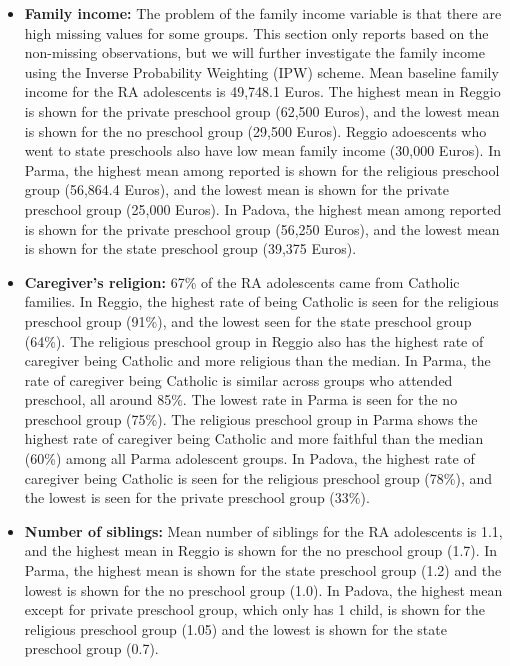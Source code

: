 \documentclass[12pt]{article}
\begin{document}
\begin{itemize}
\item \textbf{Family income:} The problem of the family income variable is that there are high missing values for some groups. This section only reports based on the non-missing observations, but we will further investigate the family income using the Inverse Probability Weighting (IPW) scheme. Mean baseline family income for the RA adolescents is 49,748.1 Euros. The highest mean in Reggio is shown for the private preschool group (62,500 Euros), and the lowest mean is shown for the no preschool group (29,500 Euros). Reggio adoescents who went to state preschools also have low mean family income (30,000 Euros). In Parma, the highest mean among reported is shown for the religious preschool group (56,864.4 Euros), and the lowest mean is shown for the private preschool group (25,000 Euros). In Padova, the highest mean among reported is shown for the private preschool group (56,250 Euros), and the lowest mean is shown for the state preschool group (39,375 Euros).

\item \textbf{Caregiver's religion:} 67\% of the RA adolescents came from Catholic families. In Reggio, the highest rate of being Catholic is seen for the religious preschool group (91\%), and the lowest seen for the state preschool group (64\%). The religious preschool group in Reggio also has the highest rate of caregiver being Catholic and more religious than the median.  In Parma, the rate of caregiver being Catholic is similar across groups who attended preschool, all around 85\%. The lowest rate in Parma is seen for the no preschool group (75\%). The religious preschool group in Parma shows the highest rate of caregiver being Catholic and more faithful than the median (60\%) among all Parma adolescent groups. In Padova, the highest rate of caregiver being Catholic is seen for the religious preschool group (78\%), and the lowest is seen for the private preschool group (33\%). 

\item \textbf{Number of siblings:} Mean number of siblings for the RA adolescents is 1.1, and the highest mean in Reggio is shown for the no preschool group (1.7). In Parma, the highest mean is shown for the state preschool group (1.2) and the lowest is shown for the no preschool group (1.0). In Padova, the highest mean except for private preschool group, which only has 1 child, is shown for the religious preschool group (1.05) and the lowest is shown for the state preschool group (0.7). 
\end{itemize}
\end{document}
